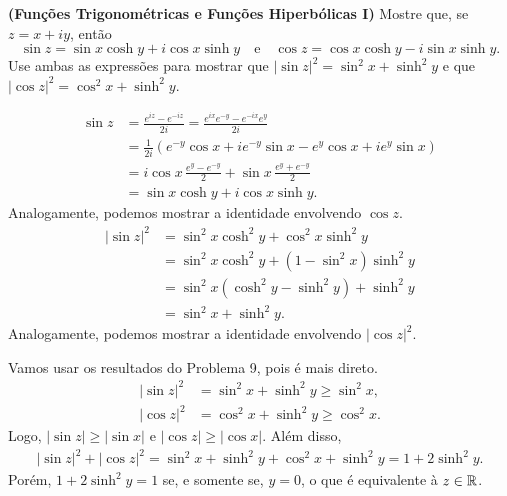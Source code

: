 \begin{questions}
{%
\question
{\bf (Funções Trigonométricas e Funções Hiperbólicas I)} Mostre que, se $z = x + i y$, então
 \[
 \sin z = \sin x \cosh y + i \cos x \sinh y \quad \text{e} \quad \cos z = \cos x \cosh y - i \sin x \sinh y.
 \]
 Use ambas as expressões para mostrar que $|\sin z|^2 = \sin^2 x + \sinh^2 y$ e que $|\cos z|^2 = \cos^2 x + \sinh^2 y$.
}
\begin{solution}
    \begin{align*}
        \sin z &= \frac{e^{iz}-e^{-iz}}{2i}
                = \frac{e^{ix}e^{-y}-e^{-ix}e^{y}}{2i} \\
            &= \frac{1}{2i}\left( e^{-y} \cos x + i e^{-y} \sin x - e^{y} \cos x + i e^{y} \sin x \right) \\
            &=  i \cos x\,\frac{e^{y} - e^{-y}}{2} + \sin x\,\frac{e^{y} + e^{-y}}{2} \\
            &= \sin x \cosh y + i \cos x \sinh y.
    \end{align*}
    Analogamente, podemos mostrar a identidade envolvendo $\cos z$.
    \begin{align*}
        |\sin z|^2 &= \sin^2 x \cosh^2 y + \cos^2 x \sinh^2 y \\
            &= \sin^2 x \cosh^2 y + (1 - \sin^2 x) \sinh^2 y \\
            &= \sin^2 x (\cosh^2 y - \sinh^2 y) + \sinh^2 y \\
            &= \sin^2 x + \sinh^2 y.
    \end{align*}
    Analogamente, podemos mostrar a identidade envolvendo $|\cos z|^2$.
\end{solution}

\setcounter{question}{10}
\begin{solution}
Vamos usar os resultados do Problema 9, pois é mais direto.
    \begin{align*}
        |\sin z|^2 &= \sin^2 x + \sinh^2 y \ge \sin^2 x,\\
        |\cos z|^2 &= \cos^2 x + \sinh^2 y \ge \cos^2 x.
    \end{align*}
    Logo, $|\sin z| \geq |\sin x|$ e $|\cos z| \geq |\cos x|$. Além disso,
    \begin{align*}
        |\sin z|^2 + |\cos z|^2
            = \sin^2 x + \sinh^2 y + \cos^2 x + \sinh^2 y
            = 1 + 2\sinh^2 y.
    \end{align*}
    Porém, $1 + 2\sinh^2 y = 1$ se, e somente se, $y = 0$, o que é equivalente à  $z\in{\mathbb R}$.
\end{solution}


\end{questions}
